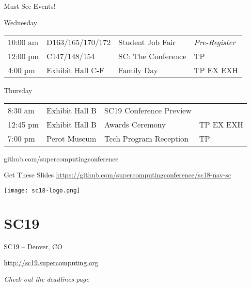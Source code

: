 \documentclass[presentation,xcolor=table]{beamer}
\begin{document}
\begin{frame}[label={sec:org6187cf1}]{Must See Events!}
\begin{block}{Wednesday}
\begin{center}
\begin{tabular}{llll}
10:00 am & D163/165/170/172 & \alert{Student Job Fair} & \emph{Pre-Register}\\
12:00 pm & C147/148/154 & \alert{SC: The Conference} & \colorbox{sc18 red}{\color{white}TP}\\
4:00 pm & Exhibit Hall C-F & \alert{Family Day} & \colorbox{sc18 red}{\color{white}TP EX EXH}\\
\end{tabular}
\end{center}
\end{block}

\begin{block}{Thursday}
\begin{center}
\begin{tabular}{llll}
8:30 am & Exhibit Hall B & \alert{SC19 Conference Preview} & \\
12:45 pm & Exhibit Hall B & \alert{Awards Ceremony} & \colorbox{sc18 red}{\color{white}TP EX EXH}\\
7:00 pm & Perot Museum & \alert{Tech Program Reception} & \colorbox{sc18 red}{\color{white}TP}\\
\end{tabular}
\end{center}
\end{block}
\end{frame}

\begin{frame}[label={sec:orgce39ae6}]{github.com/supercomputingconference}
\begin{block}{\centering Get These Slides}
\url{https://github.com/supercomputingconference/sc18-nav-sc}

\begin{center}
\texttt{[image: sc18-logo.png]}
\end{center}
\end{block}
\end{frame}

\section{SC19}
\label{sec:org3cf58fd}
\begin{frame}[label={sec:org5348f85}]{SC19 -- Denver, CO}
\begin{center}
\url{http://sc19.supercomputing.org}

\emph{Check out the deadlines page}
\end{center}
\end{frame}
\end{document}
